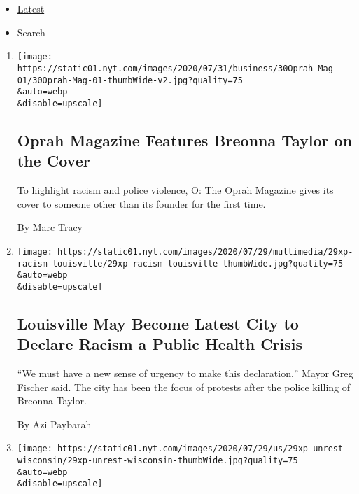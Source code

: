 \begin{itemize}
\tightlist
\item
  \protect\hyperlink{stream-panel}{Latest}
\item
  Search
\end{itemize}

\begin{enumerate}
\def\labelenumi{\arabic{enumi}.}
\item
  \href{/2020/07/30/business/media/oprah-magazine-breonna-taylor-cover.html}{}

  \texttt{[image: https://static01.nyt.com/images/2020/07/31/business/30Oprah-Mag-01/30Oprah-Mag-01-thumbWide-v2.jpg?quality=75\\\&auto=webp\\\&disable=upscale]}

  \hypertarget{oprah-magazine-features-breonna-taylor-on-the-cover}{%
  \subsection{Oprah Magazine Features Breonna Taylor on the
  Cover}\label{oprah-magazine-features-breonna-taylor-on-the-cover}}

  To highlight racism and police violence, O: The Oprah Magazine gives
  its cover to someone other than its founder for the first time.

  By Marc Tracy
\item
  \href{/2020/07/30/us/louisville-racism-crisis.html}{}

  \texttt{[image: https://static01.nyt.com/images/2020/07/29/multimedia/29xp-racism-louisville/29xp-racism-louisville-thumbWide.jpg?quality=75\\\&auto=webp\\\&disable=upscale]}

  \hypertarget{louisville-may-become-latest-city-to-declare-racism-a-public-health-crisis}{%
  \subsection{Louisville May Become Latest City to Declare Racism a
  Public Health
  Crisis}\label{louisville-may-become-latest-city-to-declare-racism-a-public-health-crisis}}

  ``We must have a new sense of urgency to make this declaration,''
  Mayor Greg Fischer said. The city has been the focus of protests after
  the police killing of Breonna Taylor.

  By Azi Paybarah
\item
  \href{/2020/07/29/us/wisconsin-tim-carpenter-attacked.html}{}

  \texttt{[image: https://static01.nyt.com/images/2020/07/29/us/29xp-unrest-wisconsin/29xp-unrest-wisconsin-thumbWide.jpg?quality=75\\\&auto=webp\\\&disable=upscale]}


\end{enumerate}
